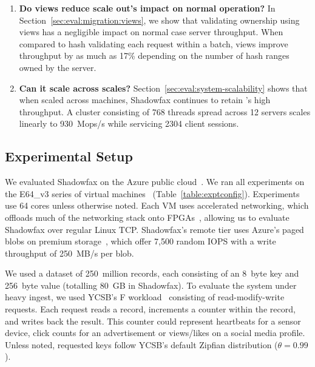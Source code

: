 \begin{enumerate}
\item {\bf Do views reduce scale out's impact on normal operation?}
  In Section~\ref{sec:eval:migration:views}, we show that validating ownership
  using views has a negligible impact on normal case server throughput.
%
  When compared to hash validating each request within a batch, views
  improve throughput by as much as 17\% depending on the number of hash
  ranges owned by the server.

\item {\bf Can it scale across scales?}
  Section~\ref{sec:eval:system-scalability} shows that when scaled across
  machines, Shadowfax continues to retain \faster's high throughput.
%
  A cluster consisting of 768 threads spread across 12 servers scales
  linearly to 930~Mops/s while servicing 2304 client sessions.

\end{enumerate}

%

\subsection{Experimental Setup}

We evaluated Shadowfax on the Azure public cloud~\cite{azure}.
%
We ran all experiments on the E64\_v3 series of virtual
machines~\cite{e64} (Table~\ref{table:exptconfig}).
%
Experiments use 64 cores unless otherwise noted.
%
Each VM uses accelerated networking, which offloads
much of the networking stack onto FPGAs~\cite{accel-nw}, allowing us to
evaluate Shadowfax over regular Linux TCP.
%
Shadowfax's remote tier uses Azure's paged blobs on premium
storage~\cite{page-blobs}, which offer 7,500 random IOPS with a write
throughput of 250~MB/s per blob.

We used a dataset of 250~million records, each consisting of
an 8~byte key and 256~byte value (totalling 80~GB in Shadowfax).
%
To evaluate the system under heavy ingest, we used YCSB's F
workload~\cite{ycsb} consisting of read-modify-write requests.
%
Each request reads a record, increments a counter within the record, and
writes back the result.
%
This counter could represent heartbeats for a sensor device, click
counts for an advertisement or views/likes on a social media profile.
%
Unless noted, requested keys follow YCSB's default Zipfian distribution ($\theta = 0.99$).

